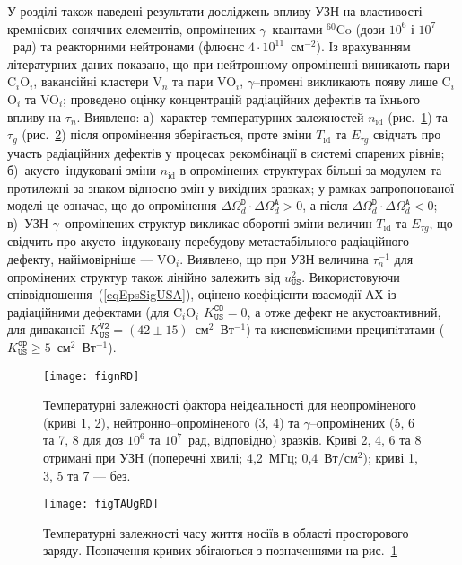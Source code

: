 У розділі також наведені результати досліджень впливу УЗН на властивості кремнієвих сонячних елементів,
опромінених $\gamma$--квантами $^{60}$Co (дози $10^6$ і $10^7$~рад) та реакторними нейтронами (флюєнс $4\cdot10^{11}$~см$^{-2}$).
Із врахуванням літературних даних показано, що при нейтронному опроміненні виникають пари C$_i$O$_i$,
вакансійні кластери V$_n$ та пари VO$_i$, $\gamma$--промені викликають появу лише C$_i$O$_i$ та VO$_i$;
проведено оцінку концентрацій радіаційних дефектів та їхнього впливу на $\tau_n$.
Виявлено:
а)~характер температурних залежностей  $n_\mathrm{id}$ (рис.~\ref{fignRD}) та $\tau_{g}$ (рис.~\ref{figTAUgRD})
після опромінення зберігається, проте зміни $T_{\mathrm{id}}$ та $E_{\tau g}$ свідчать про участь радіаційних дефектів у процесах рекомбінації в системі спарених рівнів;
б)~акусто--індуковані зміни $n_\mathrm{id}$ в опромінених структурах більші за модулем та протилежні за знаком відносно змін у вихідних зразках;
у рамках запропонованої моделі
це означає, що до опромінення $\Delta\Omega_d^\mathtt{D}\cdot\Delta\Omega_d^\mathtt{A}>0$, а після $\Delta\Omega_d^\mathtt{D}\cdot\Delta\Omega_d^\mathtt{A}<0$;
в)~УЗН $\gamma$--опромінених структур викликає оборотні зміни величин $T_{\mathrm{id}}$ та $E_{\tau g}$,
що свідчить про акусто--індуковану перебудову метастабільного радіаційного дефекту, найімовірніше --- VO$_i$.
Виявлено, що при УЗН величина $\tau_n^{-1}$ для опромінених структур також лінійно залежить від $u_{\mathtt{US}}^2$.
Використовуючи співвідношення~(\ref{eqEpsSigUSA}), оцінено коефіцієнти взаємодії АХ із радіаційними дефектами (для C$_i$O$_i$ $K_\mathtt{US}^\mathtt{CO}=0$, а отже дефект не акустоактивний,
для дивакансії $K_\mathtt{US}^\mathtt{V2}=(42\pm15)$~см$^2$~Вт$^{-1}$)
та кисневмiсними преципiтатами ($K_\mathtt{US}^\mathtt{op}\geq5$~см$^2$~Вт$^{-1}$).

\begin{figure}[h]
\center
\texttt{[image: fignRD]}%
\caption{\label{fignRD}
Температурні залежності фактора неідеальності
для неопроміненого (криві 1, 2),
нейтронно--опроміненого (3, 4) та
$\gamma$--опромінених (5, 6 та 7, 8 для доз $10^6$ та $10^7$~рад, відповідно)
зразків.
Криві 2, 4, 6 та 8 отримані при УЗН (поперечні хвилі; 4,2~МГц; 0,4~Вт/см$^2$);
криві 1, 3, 5 та 7 --- без.
}%
\end{figure}
\vspace{-0.7cm}
\begin{figure}[h]
\center
\texttt{[image: figTAUgRD]}%
\caption{\label{figTAUgRD}
Температурні залежності часу життя носіїв в області просторового заряду.
Позначення кривих збігаються з позначеннями на рис.~\ref{fignRD}
}%
\end{figure}



